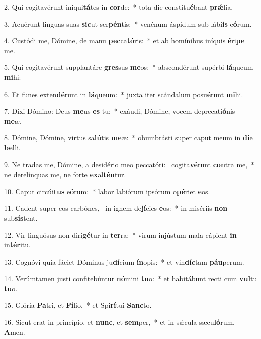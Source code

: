 2. Qui cogitavérunt iniqui\textbf{tá}tes in \textbf{cor}de:~*  tota die constitu\textbf{é}bant \textbf{prǽ}lia.\

3. Acuérunt linguas suas \textbf{sic}ut ser\textbf{pén}tis:~*  venénum áspidum sub lábi\textbf{is} e\textbf{ó}rum.\

4. Custódi me, Dómine, de manu \textbf{pec}ca\textbf{tó}ris:~*  et ab homínibus iníquis \textbf{é}ri\textbf{pe} me.\

5. Qui cogitavérunt supplantáre \textbf{gres}sus \textbf{me}os:~*  abscondérunt supérbi \textbf{lá}queum \textbf{mi}hi:\

6. Et funes exten\textbf{dé}runt in \textbf{lá}queum:~*  juxta iter scándalum posu\textbf{é}runt \textbf{mi}hi.\

7. Dixi Dómino: Deus \textbf{me}us \textbf{es} tu:~*  exáudi, Dómine, vocem deprecati\textbf{ó}nis \textbf{me}æ.\

8. Dómine, Dómine, virtus sa\textbf{lú}tis \textbf{me}æ:~*  obumbrásti super caput meum in \textbf{di}e \textbf{bel}li.\

9. Ne tradas me, Dómine, a desidério meo peccatóri: \dag\  cogita\textbf{vé}runt \textbf{con}tra me,~*  ne derelínquas me, ne forte \textbf{ex}al\textbf{tén}tur.\

10. Caput circúi\textbf{tus} e\textbf{ó}rum:~*  labor labiórum ipsórum o\textbf{pé}riet \textbf{e}os.\

11. Cadent super eos carbónes, \dag\  in ignem de\textbf{jí}cies \textbf{e}os:~*  in misériis \textbf{non} sub\textbf{sís}tent.\

12. Vir linguósus non diri\textbf{gé}tur in \textbf{ter}ra:~*  virum injústum mala cápient \textbf{in} in\textbf{tér}itu.\

13. Cognóvi quia fáciet Dóminus ju\textbf{dí}cium \textbf{ín}opis:~*  et vin\textbf{díc}tam \textbf{páu}perum.\

14. Verúmtamen justi confitebúntur \textbf{nó}mini \textbf{tu}o:~*  et habitábunt recti cum \textbf{vul}tu \textbf{tu}o.\

15. Glória \textbf{Pa}tri, et \textbf{Fí}lio,~*  et Spi\textbf{rí}tui \textbf{Sanc}to.\

16. Sicut erat in princípio, et \textbf{nunc}, et \textbf{sem}per,~*  et in sǽcula sæcu\textbf{ló}rum. \textbf{A}men.\

